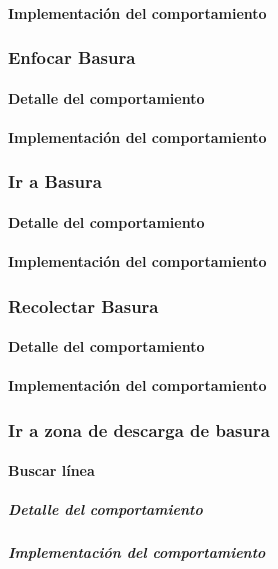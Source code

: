\paragraph{Implementaci\'on del comportamiento}

\subsubsection{Enfocar Basura}
\label{focus_garbage}
\paragraph{Detalle del comportamiento}
\paragraph{Implementaci\'on del comportamiento}

\subsubsection{Ir a Basura}
\label{go_to_garbage}
\paragraph{Detalle del comportamiento}
\paragraph{Implementaci\'on del comportamiento}

\subsubsection{Recolectar Basura}
\label{collect_garbage}
\paragraph{Detalle del comportamiento}
\paragraph{Implementaci\'on del comportamiento}

\subsubsection{Ir a zona de descarga de basura}
\label{go_to_unload_zone}

\paragraph{Buscar l\'inea}
\label{find_line}
\subparagraph{Detalle del comportamiento}
\subparagraph{Implementaci\'on del comportamiento}

